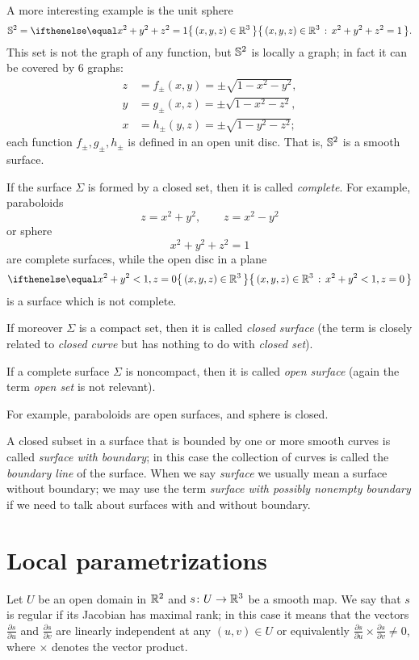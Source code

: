 A more interesting example is the unit sphere 
\[\SS^2=\set{(x,y,z)\in\RR^3}{x^2+y^2+z^2=1}.\]
This set is not the graph of any function,
but $\mathbb{S}^2$ is locally a graph;
in fact it can be covered by 6 graphs:
\begin{align*}
z&=f_\pm(x,y)=\pm \sqrt{1-x^2-y^2},
\\
y&=g_\pm(x,z)=\pm \sqrt{1-x^2-z^2},
\\
x&=h_\pm(y,z)=\pm \sqrt{1-y^2-z^2};
\end{align*}
each function $f_\pm,g_\pm,h_\pm$ is defined in an open unit disc.
That is, $\mathbb{S}^2$ is a smooth surface.

If the surface $\Sigma$ is formed by a closed set, then it is called \emph{complete}. %
For example, paraboloids %
\[z=x^2+y^2,\quad\quad z=x^2-y^2\]
or sphere 
\[x^2+y^2+z^2=1\]
are complete surfaces, while the
open disc in a plane 
\[\set{(x,y,z)\in\RR^3}{x^2+y^2<1, z=0}\]
is a surface which is not complete.

If moreover $\Sigma$ is a compact set, then it is called \emph{closed surface}
(the term is closely related to \emph{closed curve} but has nothing to do with \emph{closed set}).

If a complete surface $\Sigma$ is noncompact, then it is called  \emph{open surface} (again the term \emph{open set} is not relevant).

For example, paraboloids 
are open surfaces, 
and sphere is closed.

A closed subset in a surface that is bounded by one or more smooth %
curves is called \emph{surface with boundary}; in this case the collection of curves is called the \emph{boundary line} of the surface.
When we say \emph{surface} we usually mean a surface without boundary;
we may use the term \emph{surface with possibly nonempty boundary} if we need to talk about surfaces with and without boundary.

\section*{Local parametrizations}

Let $U$ be an open domain in $\mathbb{R}^2$ and $s\colon U\to \mathbb{R}^3$ be a smooth map.
We say that $s$ is regular if its Jacobian has maximal rank;
in this case it means that the vectors $\tfrac{\partial s}{\partial u}$ and $\tfrac{\partial s}{\partial v}$ are linearly independent at any $(u,v)\in U$ or
equivalently $\tfrac{\partial s}{\partial u}\times\tfrac{\partial s}{\partial v}\ne 0$, where $\times$ denotes the vector product.

